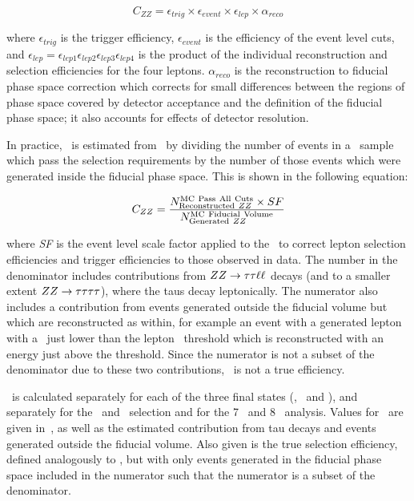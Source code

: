 \begin{equation}
C_{ZZ}= \epsilon_{trig} \times \epsilon_{event} \times \epsilon_{lep} \times \alpha_{reco}
\end{equation}

where $\epsilon_{trig}$ is the trigger efficiency, $\epsilon_{event}$ is 
the efficiency of the event level cuts, and
$\epsilon_{lep} =\epsilon_{lep1}\epsilon_{lep2}\epsilon_{lep3}\epsilon_{lep4}$ is the product of the 
individual reconstruction and selection efficiencies for the four leptons. 
$\alpha_{reco}$ is the reconstruction to 
fiducial phase space correction which corrects for small differences between the
regions of phase space covered by detector acceptance and the definition of the
fiducial phase space; it also accounts for effects of detector resolution. 

In practice, \CZZ\ is estimated from \mc\ by dividing the number of events in a
\ZZllll\ sample which pass the selection requirements by the number of those events
which were generated inside the fiducial phase space. This is shown in the
following equation:

\begin{equation}
C_{ZZ}= \frac{ N^{\rm MC\ Pass\ All\ Cuts}_{{\rm Reconstructed}\ ZZ} \times
SF }{ N^{{\rm MC\ Fiducial\ Volume}}_{{\rm Generated}\ ZZ} }
\end{equation}

where {\it SF} is the event level scale factor applied to the \mc\ to correct
lepton selection efficiencies and trigger efficiencies to those observed in
data. The number in the denominator includes contributions from
$ZZ\rightarrow\tau\tau\ell\ell$ decays (and to a smaller extent
$ZZ\rightarrow\tau\tau\tau\tau$), where the taus decay leptonically. The numerator also
includes a contribution from events generated outside the fiducial volume but
which are reconstructed as within, for example an event with a generated lepton
with a \pt\ just lower than the lepton \pt\ threshold which is reconstructed
with an energy just above the threshold. Since the numerator is not a subset of
the denominator due to these two contributions, \CZZ\ is not a true efficiency. 

\CZZ\ is calculated separately for each of the three final states (\eeee, \mmmm\
and \eemm), and separately for the \ZZ\ and \ZZs\ selection and for the 7 \tev\
and 8 \tev\ analysis. Values for \CZZ\ are given
in~\tabs{objSel-czz-seven}{objSel-czz-eight}, as well as the estimated
contribution from tau decays and events generated outside the fiducial volume.
Also given is the true selection efficiency, defined analogously to \CZZ, but
with only events generated in the fiducial phase space included in the numerator
such that the numerator is a subset of the denominator.

